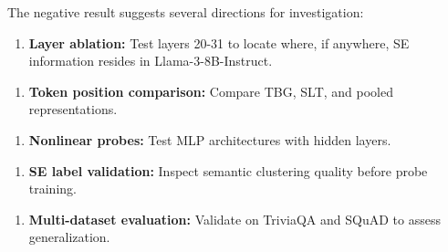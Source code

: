 The negative result suggests several directions for investigation:

\begin{enumerate}
\item \textbf{Layer ablation:} Test layers 20-31 to locate where, if anywhere, SE information resides in Llama-3-8B-Instruct.
\end{enumerate}

\begin{enumerate}
\item \textbf{Token position comparison:} Compare TBG, SLT, and pooled representations.
\end{enumerate}

\begin{enumerate}
\item \textbf{Nonlinear probes:} Test MLP architectures with hidden layers.
\end{enumerate}

\begin{enumerate}
\item \textbf{SE label validation:} Inspect semantic clustering quality before probe training.
\end{enumerate}

\begin{enumerate}
\item \textbf{Multi-dataset evaluation:} Validate on TriviaQA and SQuAD to assess generalization.
\end{enumerate}
